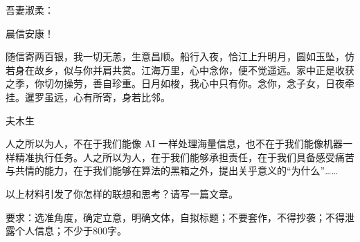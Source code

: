 \documentclass[11pt,a4paper]{ctexart}
\begin{document}

\par\vspace{2.2em}


\begin{materialtext}
吾妻淑柔：\par
晨信安康！\par
随信寄两百银，我一切无恙，生意昌顺。船行入夜，恰江上升明月，圆如玉坠，仿若身在故乡，似与你并肩共赏。江海万里，心中念你，便不觉遥远。家中正是收获之季，你切勿操劳，善自珍重。日月如梭，我心中只有你。念你，念子女，日夜牵挂。暹罗虽远，心有所寄，身若比邻。\par
\hfill 夫\quad 木生
\end{materialtext}

\par\vspace{2.2em}


\par\vspace{2.2em}\par\vspace{2.2em}



{\ywkai 人之所以为人，不在于我们能像 AI 一样处理海量信息，也不在于我们能像机器一样精准执行任务。人之所以为人，在于我们能够承担责任，在于我们具备感受痛苦与共情的能力，在于我们能够在算法的黑箱之外，提出关乎意义的“为什么”……}

以上材料引发了你怎样的联想和思考？请写一篇文章。

要求：选准角度，确定立意，明确文体，自拟标题；不要套作，不得抄袭；不得泄露个人信息；不少于800字。
\end{document}
